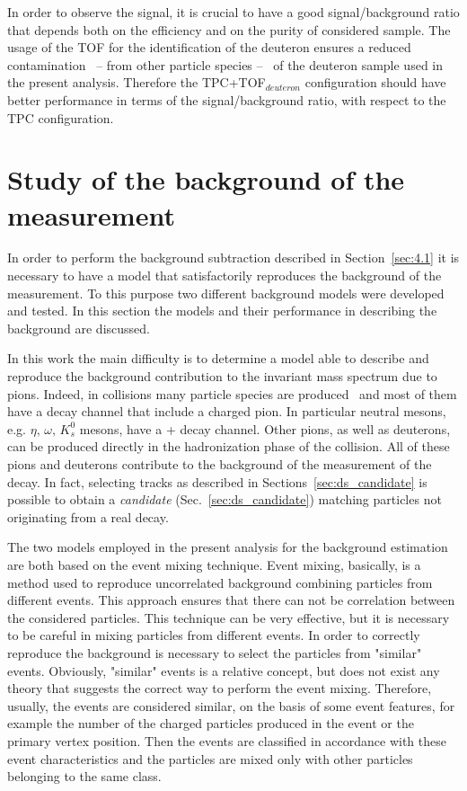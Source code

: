 In order to observe the \ds signal, it is crucial to have a good signal/background ratio that depends
both on the efficiency and on the purity of considered sample.
The usage of the TOF for the identification of the deuteron ensures a reduced contamination \ -- from 
other particle species -- \ of the deuteron sample used in the present analysis. 
Therefore the TPC+TOF$_{deuteron}$ configuration should have better performance in terms of the 
signal/background ratio, with respect to the TPC configuration.

%
%
\section{Study of the background of the measurement} \label{sec:background}

In order to perform the background subtraction described in Section~\ref{sec:4.1} it is necessary to have
a model that satisfactorily reproduces the background of the measurement. 
To this purpose two different background models were developed and tested. 
In this section the models and their performance in describing the background are discussed.

In this work the main difficulty is to determine a model able to describe and reproduce the background 
contribution to the invariant mass spectrum due to pions.
Indeed, in \pPb collisions many particle species are produced~\cite{pkp_prod, neutralp, k0s_prod} 
and most of them have a decay channel that include a charged pion.
In particular neutral mesons, e.g. $\eta,\,\omega,\,K_{s}^{0}$ mesons, have a 
\pip + \pim decay channel. Other pions, as well as deuterons, can be produced directly
in the hadronization phase of the collision.
All of these pions and deuterons contribute to the background of the measurement of the
\dstdecay decay. In fact, selecting tracks as described in Sections~\ref{sec:ds_candidate}
is possible to obtain a \textit{\ds candidate} (Sec.~\ref{sec:ds_candidate})
matching particles not originating from a real \ds decay.

The two models employed in the present analysis for the background estimation are both based on the event mixing technique.
Event mixing, basically, is a method used to reproduce uncorrelated background combining particles from
different events. This approach ensures that there can not be correlation between the considered particles.
This technique can be very effective, but it is necessary to be careful in mixing particles from 
different events.
In order to correctly reproduce the background is necessary to select the particles from "similar"
events.
Obviously, "similar" events is a relative concept, but does not exist any theory that suggests
the correct way to perform the event mixing.
Therefore, usually, the events are considered similar, on the basis of some event features,
for example the number of the charged particles produced in the event or the primary vertex position.
Then the events are classified in accordance with these event characteristics and the particles 
are mixed only with other particles belonging to the same class.

